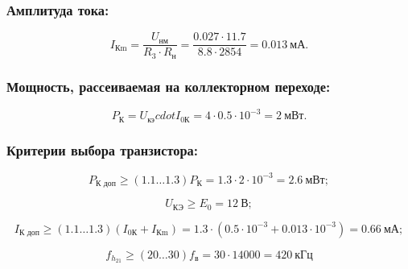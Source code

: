   \subsubsection{Амплитуда тока:} %
  
  \begin{equation}
  \label{eq:equation6_9}
    I_{\text{Кm}} = \dfrac{U_{\text{нм}}}{R_3 \cdot R_{\text{н}}} = \dfrac{0.027 \cdot 11.7}{8.8 \cdot 2854} = 0.013~\text{мА}.
  \end{equation}
  
  \subsubsection{Мощность, рассеиваемая на коллекторном переходе:} %

  \begin{equation}
  \label{eq:equation6_10}
    P_{\text{К}} = U_{\text{кэ}} cdot I_{\text{0К}} = 4 \cdot 0.5 \cdot 10^{-3} = 2~\text{мВт}. 
  \end{equation}
  

  \subsubsection{Критерии выбора транзистора:} %

  \begin{equation}
  \label{eq:equation6_11}
    P_{\text{К доп}} \geq (1.1 \ldots 1.3) P_{\text{К}} = 1.3 \cdot 2 \cdot 10^{-3} = 2.6~\text{мВт};
  \end{equation} 

  \begin{equation}
   \label{eq:equation6_12}
     U_{\text{КЭ}} \geq E_0 = 12~\text{В};
  \end{equation} 

  \begin{equation}
  \label{eq:equation6_13}
    I_{\text{К доп}} \geq (1.1 \ldots 1.3)(I_{\text{0К}} + I_{\text{Кm}}) = 1.3 \cdot (0.5 \cdot 10^{-3} + 0.013 \cdot 10^{-3}) = 0.66~\text{мА}; 
  \end{equation} 

  \begin{equation}
   \label{eq:equation6_14}
     f_{h_{21}} \geq (20 \ldots 30) f_{\text{в}} = 30 \cdot 14000 = 420~\text{кГц}
  \end{equation} 
